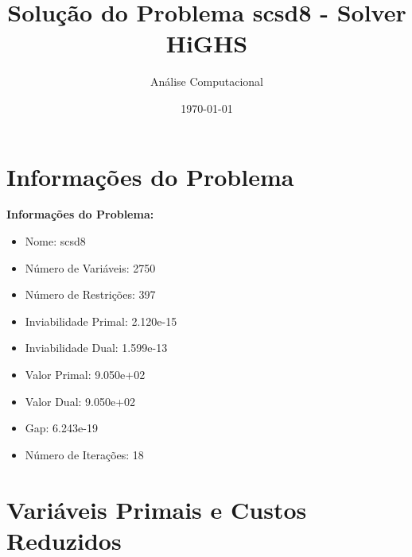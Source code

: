 \documentclass[12pt]{article}
\title{Solução do Problema scsd8 - Solver HiGHS}
\author{Análise Computacional}
\date{\today}
\begin{document}
\maketitle

\section{Informações do Problema}

\textbf{Informações do Problema:}
\begin{itemize}
\item Nome: scsd8
\item Número de Variáveis: 2750
\item Número de Restrições: 397
\item Inviabilidade Primal: 2.120e-15
\item Inviabilidade Dual: 1.599e-13
\item Valor Primal: 9.050e+02
\item Valor Dual: 9.050e+02
\item Gap: 6.243e-19
\item Número de Iterações: 18
\end{itemize}


\section{Variáveis Primais e Custos Reduzidos}
\end{document}
